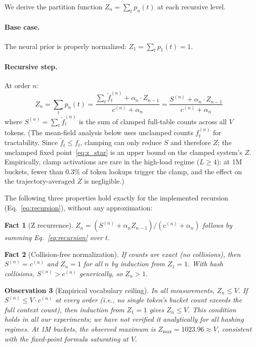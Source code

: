 \documentclass[11pt]{article}
\begin{document}
We derive the partition function $Z_n = \sum_t p_n(t)$ at each recursive level.

\paragraph{Base case.} The neural prior is properly normalized: $Z_1 = \sum_t p_1(t) = 1$.

\paragraph{Recursive step.} At order $n$:
\begin{equation}
Z_n = \sum_t p_n(t) = \frac{\sum_t \tilde{f}_t^{(n)} + \alpha_n \cdot Z_{n-1}}{c^{(n)} + \alpha_n} = \frac{S^{(n)} + \alpha_n \cdot Z_{n-1}}{c^{(n)} + \alpha_n}
\label{eq:z_recurrence}
\end{equation}
where $S^{(n)} = \sum_t \tilde{f}_t^{(n)}$ is the sum of clamped full-table counts across all $V$ tokens. (The mean-field analysis below uses unclamped counts $f_t^{(n)}$ for tractability. Since $\tilde{f}_t \leq f_t$, clamping can only reduce $S$ and therefore $Z$; the unclamped fixed point~\eqref{eq:z_star} is an upper bound on the clamped system's $Z$. Empirically, clamp activations are rare in the high-load regime ($L \geq 4$): at 1M buckets, fewer than 0.3\% of token lookups trigger the clamp, and the effect on the trajectory-averaged $Z$ is negligible.)

The following three properties hold exactly for the implemented recursion (Eq.~\ref{eq:recursion}), without any approximation:

\smallskip
\noindent\textbf{Fact 1} (Z recurrence). \emph{$Z_n = (S^{(n)} + \alpha_n Z_{n-1})/(c^{(n)} + \alpha_n)$ follows by summing Eq.~\ref{eq:recursion} over $t$.}

\smallskip
\noindent\textbf{Fact 2} (Collision-free normalization). \emph{If counts are exact (no collisions), then $S^{(n)} = c^{(n)}$ and $Z_n = 1$ for all $n$ by induction from $Z_1 = 1$. With hash collisions, $S^{(n)} > c^{(n)}$ generically, so $Z_n > 1$.}

\smallskip
\noindent\textbf{Observation 3} (Empirical vocabulary ceiling). \emph{In all measurements, $Z_n \leq V$. If $S^{(n)} \leq V \cdot c^{(n)}$ at every order (i.e., no single token's bucket count exceeds the full context count), then induction from $Z_1 = 1$ gives $Z_n \leq V$. This condition holds in all our experiments; we have not verified it analytically for all hashing regimes. At 1M buckets, the observed maximum is $Z_{\max} = 1023.96 \approx V$, consistent with the fixed-point formula saturating at $V$.}
\end{document}
